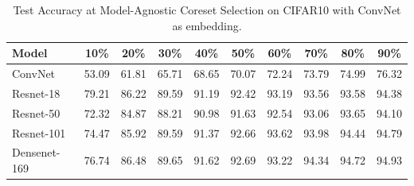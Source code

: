 \begin{table}[t]
    \centering
    \caption{Test Accuracy at Model-Agnostic Coreset Selection on CIFAR10 with ConvNet as embedding.}
    \label{tab:model_agnostic}
    \begin{tabular}{lccccccccc}
        \toprule
        \textbf{Model} & \textbf{10\%} & \textbf{20\%} & \textbf{30\%} & \textbf{40\%} & \textbf{50\%} & \textbf{60\%} & \textbf{70\%} & \textbf{80\%} & \textbf{90\%} \\
        \midrule
        ConvNet & 53.09 & 61.81 & 65.71 & 68.65 & 70.07 & 72.24 & 73.79 & 74.99 & 76.32 \\
        Resnet-18 & 79.21& 86.22 & 89.59 & 91.19& 92.42& 93.19 & 93.56& 93.58& 94.38 \\
        Resnet-50 & 72.32 & 84.87 & 88.21 & 90.98& 91.63 & 92.54 & 93.06 & 93.65& 94.10 \\
        Resnet-101& 74.47 & 85.92 & 89.59 & 91.37& 92.66 & 93.62 & 93.98& 94.44& 94.79 \\
        Densenet-169 &  76.74 & 86.48 & 89.65 &91.62 &92.69& 93.22& 94.34&94.72 & 94.93 \\

        \bottomrule
    \end{tabular}
\end{table}
